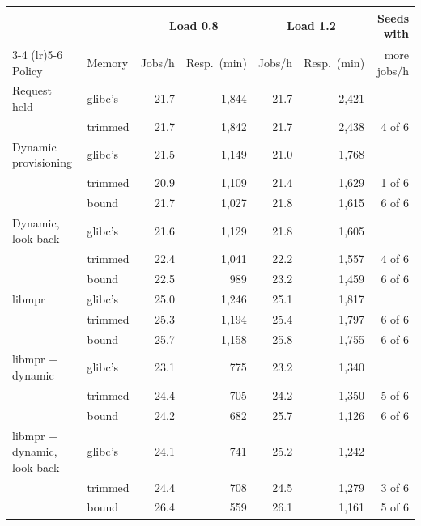\begin{tabular}{llrrrrr}
\toprule
 & & \multicolumn{2}{c}{Load 0.8} & \multicolumn{2}{c}{Load 1.2} & Seeds with \\
\cmidrule(lr){3-4} \cmidrule(lr){5-6}
Policy & Memory & Jobs/h & Resp.\ (min) & Jobs/h & Resp.\ (min) & more jobs/h \\
\midrule
Request held & glibc's & 21.7 & 1{,}844 & 21.7 & 2{,}421 &  \\
 & trimmed & 21.7 & 1{,}842 & 21.7 & 2{,}438 & 4 of 6 \\
\addlinespace
Dynamic provisioning & glibc's & 21.5 & 1{,}149 & 21.0 & 1{,}768 &  \\
 & trimmed & 20.9 & 1{,}109 & 21.4 & 1{,}629 & 1 of 6 \\
 & bound & 21.7 & 1{,}027 & 21.8 & 1{,}615 & 6 of 6 \\
\addlinespace
Dynamic, look-back & glibc's & 21.6 & 1{,}129 & 21.8 & 1{,}605 &  \\
 & trimmed & 22.4 & 1{,}041 & 22.2 & 1{,}557 & 4 of 6 \\
 & bound & 22.5 & 989 & 23.2 & 1{,}459 & 6 of 6 \\
\addlinespace
libmpr & glibc's & 25.0 & 1{,}246 & 25.1 & 1{,}817 &  \\
 & trimmed & 25.3 & 1{,}194 & 25.4 & 1{,}797 & 6 of 6 \\
 & bound & 25.7 & 1{,}158 & 25.8 & 1{,}755 & 6 of 6 \\
\addlinespace
libmpr + dynamic & glibc's & 23.1 & 775 & 23.2 & 1{,}340 &  \\
 & trimmed & 24.4 & 705 & 24.2 & 1{,}350 & 5 of 6 \\
 & bound & 24.2 & 682 & 25.7 & 1{,}126 & 6 of 6 \\
\addlinespace
libmpr + dynamic, look-back & glibc's & 24.1 & 741 & 25.2 & 1{,}242 &  \\
 & trimmed & 24.4 & 708 & 24.5 & 1{,}279 & 3 of 6 \\
 & bound & 26.4 & 559 & 26.1 & 1{,}161 & 5 of 6 \\
\bottomrule
\end{tabular}

